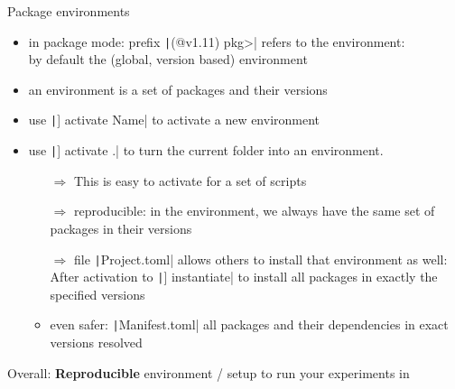 \documentclass[aspectratio=169, 12pt]{beamer}
\begin{document}
    \begin{frame}{Package environments}
        \begin{itemize}
            \item in package mode: prefix \texttt|(@v1.11) pkg>| refers to the environment:
            \\by default the (global, version based) environment
            \item an \alert{environment} is a set of packages and their versions
            \item use \texttt|] activate Name| to activate a new environment
            \item use \texttt|] activate .| to turn the current folder into an environment.
            \begin{itemize}[<+->]
                \item[$\Rightarrow$] This is easy to activate for a set of scripts
                \item[$\Rightarrow$] reproducible: in the environment,
                we always have the same set of packages in their versions
                \item[$\Rightarrow$] file \texttt|Project.toml| allows others to install that environment as well:\\
                After activation to \texttt|] instantiate| to install all packages in exactly the specified versions
                \item even safer: \texttt|Manifest.toml| all packages and their dependencies in \alert{exact versions} resolved
            \end{itemize}
        \end{itemize}
        \pause
        \alert{Overall:} \textbf{Reproducible} environment / setup to run your experiments in
    \end{frame}
\end{document}
